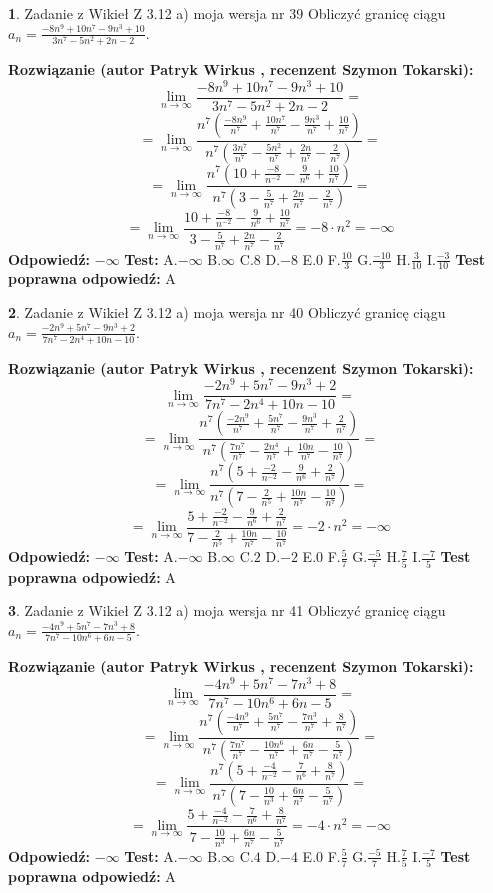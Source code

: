 \documentclass[12pt, a4paper]{article}
\theoremstyle{definition} %
\newtheorem{zad}{}
\newcommand{\zadStart}[1]{\begin{zad}#1\newline}
\newcommand{\zadStop}{\end{zad}}
\newcommand{\rozwStart}[2]{\noindent \textbf{Rozwiązanie (autor #1 , recenzent #2): }\newline}
\newcommand{\rozwStop}{\newline}
\newcommand{\odpStart}{\noindent \textbf{Odpowiedź:}\newline}
\newcommand{\odpStop}{\newline}
\newcommand{\testStart}{\noindent \textbf{Test:}\newline}
\newcommand{\testStop}{\newline}
\newcommand{\kluczStart}{\noindent \textbf{Test poprawna odpowiedź:}\newline}
\newcommand{\kluczStop}{\newline}
\begin{document}
\zadStart{Zadanie z Wikieł Z 3.12 a) moja wersja nr 39}
Obliczyć granicę ciągu $a_{n}=\frac{-8n^{9}+10n^{7}-9n^{3}+10}{3n^{7}-5n^{2}+2n-2}$.
\zadStop
\rozwStart{Patryk Wirkus}{Szymon Tokarski}
$$\lim\limits_{n\to\infty}\frac{-8n^{9}+10n^{7}-9n^{3}+10}{3n^{7}-5n^{2}+2n-2}=$$
$$=\lim\limits_{n\to\infty}\frac{n^{7}\left(\frac{-8n^{9}}{n^{7}}+\frac{10n^{7}}{n^{7}}-\frac{9n^{3}}{n^{7}}+\frac{10}{n^{7}}\right)}{n^{7}\left(\frac{3n^{7}}{n^{7}}-\frac{5n^{2}}{n^{7}}+\frac{2n}{n^{7}}-\frac{2}{n^{7}}\right)}=$$
$$=\lim\limits_{n\to\infty}\frac{n^{7}\left(10+\frac{-8}{n^{-2}}-\frac{9}{n^{6}}+\frac{10}{n^{7}}\right)}
{n^{7}\left(3-\frac{5}{n^{7}}+\frac{2n}{n^{7}}-\frac{2}{n^{7}}\right)}=$$
$$=\lim\limits_{n\to\infty}\frac{10+\frac{-8}{n^{-2}}-\frac{9}{n^{6}}+\frac{10}{n^{7}}}{3-\frac{5}{n^{7}}+\frac{2n}{n^{7}}-\frac{2}{n^{7}}}=-8\cdot n^{2} = -\infty$$
\rozwStop
\odpStart
$-\infty$
\odpStop
\testStart
A.$-\infty$
B.$\infty$
C.$8$
D.$-8$
E.$0$
F.$\frac{10}{3}$
G.$\frac{-10}{3}$
H.$\frac{3}{10}$
I.$\frac{-3}{10}$
\testStop
\kluczStart
A
\kluczStop



\zadStart{Zadanie z Wikieł Z 3.12 a) moja wersja nr 40}
Obliczyć granicę ciągu $a_{n}=\frac{-2n^{9}+5n^{7}-9n^{3}+2}{7n^{7}-2n^{4}+10n-10}$.
\zadStop
\rozwStart{Patryk Wirkus}{Szymon Tokarski}
$$\lim\limits_{n\to\infty}\frac{-2n^{9}+5n^{7}-9n^{3}+2}{7n^{7}-2n^{4}+10n-10}=$$
$$=\lim\limits_{n\to\infty}\frac{n^{7}\left(\frac{-2n^{9}}{n^{7}}+\frac{5n^{7}}{n^{7}}-\frac{9n^{3}}{n^{7}}+\frac{2}{n^{7}}\right)}{n^{7}\left(\frac{7n^{7}}{n^{7}}-\frac{2n^{4}}{n^{7}}+\frac{10n}{n^{7}}-\frac{10}{n^{7}}\right)}=$$
$$=\lim\limits_{n\to\infty}\frac{n^{7}\left(5+\frac{-2}{n^{-2}}-\frac{9}{n^{6}}+\frac{2}{n^{7}}\right)}
{n^{7}\left(7-\frac{2}{n^{5}}+\frac{10n}{n^{7}}-\frac{10}{n^{7}}\right)}=$$
$$=\lim\limits_{n\to\infty}\frac{5+\frac{-2}{n^{-2}}-\frac{9}{n^{6}}+\frac{2}{n^{7}}}{7-\frac{2}{n^{5}}+\frac{10n}{n^{7}}-\frac{10}{n^{7}}}=-2\cdot n^{2} = -\infty$$
\rozwStop
\odpStart
$-\infty$
\odpStop
\testStart
A.$-\infty$
B.$\infty$
C.$2$
D.$-2$
E.$0$
F.$\frac{5}{7}$
G.$\frac{-5}{7}$
H.$\frac{7}{5}$
I.$\frac{-7}{5}$
\testStop
\kluczStart
A
\kluczStop



\zadStart{Zadanie z Wikieł Z 3.12 a) moja wersja nr 41}
Obliczyć granicę ciągu $a_{n}=\frac{-4n^{9}+5n^{7}-7n^{3}+8}{7n^{7}-10n^{6}+6n-5}$.
\zadStop
\rozwStart{Patryk Wirkus}{Szymon Tokarski}
$$\lim\limits_{n\to\infty}\frac{-4n^{9}+5n^{7}-7n^{3}+8}{7n^{7}-10n^{6}+6n-5}=$$
$$=\lim\limits_{n\to\infty}\frac{n^{7}\left(\frac{-4n^{9}}{n^{7}}+\frac{5n^{7}}{n^{7}}-\frac{7n^{3}}{n^{7}}+\frac{8}{n^{7}}\right)}{n^{7}\left(\frac{7n^{7}}{n^{7}}-\frac{10n^{6}}{n^{7}}+\frac{6n}{n^{7}}-\frac{5}{n^{7}}\right)}=$$
$$=\lim\limits_{n\to\infty}\frac{n^{7}\left(5+\frac{-4}{n^{-2}}-\frac{7}{n^{6}}+\frac{8}{n^{7}}\right)}
{n^{7}\left(7-\frac{10}{n^{3}}+\frac{6n}{n^{7}}-\frac{5}{n^{7}}\right)}=$$
$$=\lim\limits_{n\to\infty}\frac{5+\frac{-4}{n^{-2}}-\frac{7}{n^{6}}+\frac{8}{n^{7}}}{7-\frac{10}{n^{3}}+\frac{6n}{n^{7}}-\frac{5}{n^{7}}}=-4\cdot n^{2} = -\infty$$
\rozwStop
\odpStart
$-\infty$
\odpStop
\testStart
A.$-\infty$
B.$\infty$
C.$4$
D.$-4$
E.$0$
F.$\frac{5}{7}$
G.$\frac{-5}{7}$
H.$\frac{7}{5}$
I.$\frac{-7}{5}$
\testStop
\kluczStart
A
\kluczStop
\end{document}
